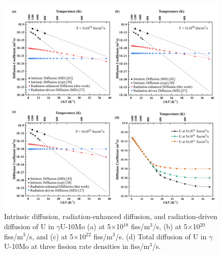 \documentclass[preprint,12pt]{elsarticle}
\begin{document}
\begin{figure}[hbt!]
\centering
\includegraphics[width=1\textwidth]{Fig5.png}
\caption{Intrinsic diffusion, radiation-enhanced diffusion, and radiation-driven diffusion of U in $\gamma$U-10Mo (a) at 5$\times$10$^{18}$ fiss/m$^{3}$/s, (b) at 5$\times$10$^{20}$ fiss/m$^{3}$/s, and (c) at 5$\times$10$^{22}$ fiss/m$^{3}$/s. (d) Total diffusion of U in $\gamma$U-10Mo at three fission rate densities in fiss/m$^{3}$/s.}
\label{fig:eachU}
\end{figure}
\end{document}
